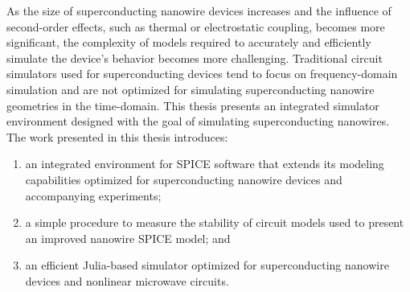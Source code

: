 % 
% 
%

As the size of superconducting nanowire devices increases and the influence of 
second-order effects, such as thermal or electrostatic coupling, becomes more significant,
the complexity of models required to accurately and efficiently simulate the device's 
behavior becomes more challenging.
Traditional circuit simulators used for superconducting devices tend to focus on 
frequency-domain simulation and
are not optimized for simulating superconducting nanowire geometries in the time-domain.
This thesis presents an integrated simulator environment designed with the goal of simulating
superconducting nanowires. 
The work presented in this thesis introduces: 
\begin{enumerate}
    \item an integrated environment for SPICE software that extends its modeling capabilities
    optimized for superconducting nanowire devices and accompanying experiments;
    \item a simple procedure to measure the stability of circuit models used to 
    present an improved nanowire SPICE model; and
    \item an efficient Julia-based simulator optimized for superconducting nanowire devices 
    and nonlinear microwave circuits.
\end{enumerate}